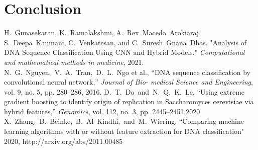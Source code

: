\documentclass[journal]{IEEEtran}
\begin{document}


\section{Conclusion}

\begin{thebibliography}{1}

H.~Gunasekaran, K.~Ramalakshmi, A.~Rex~Macedo~Arokiaraj, S.~Deepa~Kanmani, C.~Venkatesan, and C.~Suresh~Gnana~Dhas.
  "Analysis of DNA Sequence Classification Using CNN and Hybrid Models." 
  \emph{Computational and mathematical methods in medicine}, 2021.
N.~G.~Nguyen,~V.~A.~Tran,~D.~L.~Ngo et al., “DNA sequence classification by convolutional neural network,” \emph{Journal of Bio-
medical Science and Engineering}, vol. 9, no. 5, pp. 280–286, 2016.
D.~T.~Do~and~N.~Q.~K.~Le, “Using extreme gradient boosting to identify origin of replication in Saccharomyces cerevisiae via
hybrid features,” \emph{Genomics}, vol. 112, no. 3, pp. 2445–2451,2020
X.~Zhang,~B.~Beinke,~B.~Al~Kindhi,~and~M.~Wiering, “Comparing machine learning algorithms with or without feature extraction for DNA classification"
2020, http://arxiv.org/abs/2011.00485
\end{thebibliography}
\end{document}
